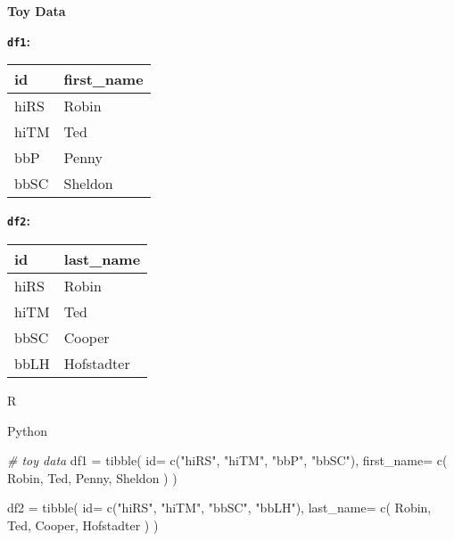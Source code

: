 \documentclass[
]{book}
\newenvironment{Shaded}{\begin{snugshade}}{\end{snugshade}}
\newcommand{\CommentTok}[1]{\textcolor[rgb]{0.56,0.35,0.01}{\textit{#1}}}
\newcommand{\FunctionTok}[1]{\textcolor[rgb]{0.00,0.00,0.00}{#1}}
\newcommand{\NormalTok}[1]{#1}
\newcommand{\OtherTok}[1]{\textcolor[rgb]{0.56,0.35,0.01}{#1}}
\newcommand{\StringTok}[1]{\textcolor[rgb]{0.31,0.60,0.02}{#1}}
\begin{document}
\textbf{Toy Data}

\textbf{\texttt{df1}:}

\begin{longtable}[]{@{}ll@{}}
\toprule
id & first\_name \\
\midrule
\endhead
hiRS & Robin \\
hiTM & Ted \\
bbP & Penny \\
bbSC & Sheldon \\
\bottomrule
\end{longtable}

\textbf{\texttt{df2}:}

\begin{longtable}[]{@{}ll@{}}
\toprule
id & last\_name \\
\midrule
\endhead
hiRS & Robin \\
hiTM & Ted \\
bbSC & Cooper \\
bbLH & Hofstadter \\
\bottomrule
\end{longtable}

R

Python

\begin{Shaded}
\begin{Highlighting}[]
\CommentTok{\# toy data}
\NormalTok{df1 }\OtherTok{=} \FunctionTok{tibble}\NormalTok{(}
    \StringTok{\textquotesingle{}id\textquotesingle{}}\OtherTok{=} \FunctionTok{c}\NormalTok{(}\StringTok{"hiRS"}\NormalTok{, }\StringTok{"hiTM"}\NormalTok{,}
           \StringTok{"bbP"}\NormalTok{, }\StringTok{"bbSC"}\NormalTok{),}
    \StringTok{\textquotesingle{}first\_name\textquotesingle{}}\OtherTok{=} \FunctionTok{c}\NormalTok{(}
        \StringTok{\textquotesingle{}Robin\textquotesingle{}}\NormalTok{,}
        \StringTok{\textquotesingle{}Ted\textquotesingle{}}\NormalTok{,}
        \StringTok{\textquotesingle{}Penny\textquotesingle{}}\NormalTok{,}
        \StringTok{\textquotesingle{}Sheldon\textquotesingle{}}
\NormalTok{    )}
\NormalTok{)}



\NormalTok{df2 }\OtherTok{=} \FunctionTok{tibble}\NormalTok{(}
    \StringTok{\textquotesingle{}id\textquotesingle{}}\OtherTok{=} \FunctionTok{c}\NormalTok{(}\StringTok{"hiRS"}\NormalTok{, }\StringTok{"hiTM"}\NormalTok{,}
            \StringTok{"bbSC"}\NormalTok{, }\StringTok{"bbLH"}\NormalTok{),}
    \StringTok{\textquotesingle{}last\_name\textquotesingle{}}\OtherTok{=} \FunctionTok{c}\NormalTok{(}
        \StringTok{\textquotesingle{}Robin\textquotesingle{}}\NormalTok{,}
        \StringTok{\textquotesingle{}Ted\textquotesingle{}}\NormalTok{,}
        \StringTok{\textquotesingle{}Cooper\textquotesingle{}}\NormalTok{,}
        \StringTok{\textquotesingle{}Hofstadter\textquotesingle{}}
\NormalTok{    )}
\NormalTok{)}
\end{Highlighting}
\end{Shaded}
\end{document}
